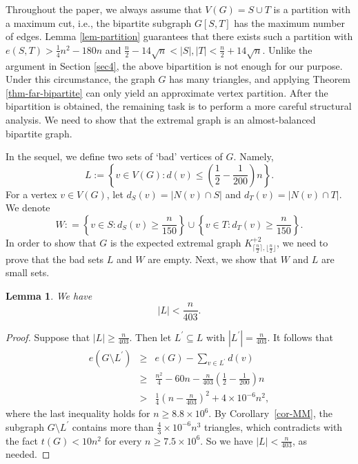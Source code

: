 \documentclass[11pt]{article}
\newtheorem{lemma}[theorem]{Lemma}
\begin{document}
        
Throughout the paper, we always assume that 
$V(G)=S\cup T$ is a partition with a maximum cut, i.e., the bipartite subgraph $G[S,T]$ has the maximum number of edges. Lemma \ref{lem-partition} guarantees that there exists such a partition with    $e(S,T) >\frac{1}{4} n^2 - 180n$ and 
        $\frac{n}{2} - 14\sqrt{n} < |S|, |T| < 
\frac{n}{2} + 14\sqrt{n}$.  
Unlike the argument in Section \ref{sec4}, 
the above bipartition is not enough for our purpose. 
Under this circumstance, the graph $G$ has many triangles, and 
applying Theorem \ref{thm-far-bipartite}  can only yield an  
approximate vertex partition. After the bipartition is obtained,  
the remaining task is to perform a more careful structural analysis. 
We need to show that the extremal graph is an almost-balanced bipartite graph. 



In the sequel, 
we define two sets of ‘bad’ vertices of $G$. Namely, 
\[ L:= \left\{v\in V(G): d(v) \leq 
\left(\frac{1}{2}-\frac{1}{200} \right) n\right\} .\]  
        For a vertex $v\in V(G)$, let $d_S(v) = |N(v) \cap S|$ and $d_T(v) = |N(v) \cap T|$. We denote 
\[ W: = \left\{ v\in S: d_S(v) \geq  \frac{n}{150} \right\} \cup 
\left\{v \in T: d_T(v) \geq  \frac{n}{150} \right\}. \]
In order to show that 
$G$ is the expected extremal graph 
$K_{\lceil \frac{n}{2} \rceil, \lfloor \frac{n}{2} \rfloor}^{+2}$, 
we need to prove that 
the bad sets $L$ and $W$ are empty. 
Next, we show that $W$ and $L$ are small sets. 

\begin{lemma}\label{Lupper}  
We have 
$$|L|< \frac{n}{403}.$$
\end{lemma}
\begin{proof}
 Suppose that $|L| \ge \frac{n}{403}$.
 Then let $L^{\prime}\subseteq L$ with $|L^{\prime}|= \frac{n}{403}$.
It follows that
   \begin{eqnarray*}
e(G\setminus L^{\prime}) &\ge& e(G)-\sum_{v\in L^{\prime}}d(v)\\
&\ge& \frac{n^2}{4} - 60n 
-  \frac{n}{403}\left(\frac{1}{2}-\frac{1}{200} \right)n\\
&>& \frac{1}{4} \left(n- \frac{n}{403} \right)^2 + 4 \times 10^{-6} n^2, 
     \end{eqnarray*}
where the last  inequality holds for $n\ge 8.8\times 10^{6}$. 
By Corollary~\ref{cor-MM}, the subgraph $G\setminus L^{\prime}$ contains more than 
$\frac{4}{3} \times 10^{-6}n^3$ triangles, which contradicts with the fact $t(G) < 10n^2$ for every $n\ge 7.5 \times 10^{6}$. 
So we have $|L| < \frac{n}{403}$, as needed. 
 \end{proof}
 
\end{document}
